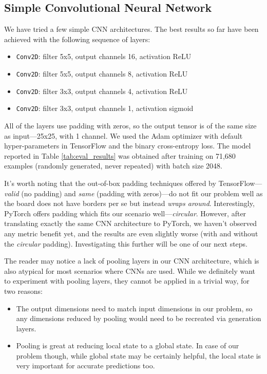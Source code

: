 \documentclass[conference]{IEEEtran}
\begin{document}
\subsection{Simple Convolutional Neural Network}

We have tried a few simple CNN architectures. The best results so far have been achieved with the following sequence of layers:

\begin{itemize}
    \item {\tt Conv2D}: filter 5x5, output channels 16, activation ReLU
    \item {\tt Conv2D}: filter 5x5, output channels 8, activation ReLU
    \item {\tt Conv2D}: filter 3x3, output channels 4, activation ReLU
    \item {\tt Conv2D}: filter 3x3, output channels 1, activation sigmoid
\end{itemize}

All of the layers use padding with zeros, so the output tensor is of the same size as input---25x25, with 1 channel. We used the Adam optimizer with default hyper-parameters in TensorFlow and the binary cross-entropy loss. The model reported in Table \ref{tab:eval_results} was obtained after training on 71,680 examples (randomly generated, never repeated) with batch size 2048.

It's worth noting that the out-of-box padding techniques offered by TensorFlow---{\it valid} (no padding) and {\it same} (padding with zeros)---do not fit our problem well as the board does not have borders per se but instead \emph{wraps around}. Interestingly, PyTorch offers padding which fits our scenario well---{\it circular}. However, after translating exactly the same CNN architecture to PyTorch, we haven't observed any metric benefit yet, and the results are even slightly worse (with and without the {\it circular} padding). Investigating this further will be one of our next steps.

The reader may notice a lack of pooling layers in our CNN architecture, which is also atypical for most scenarios where CNNs are used. While we definitely want to experiment with pooling layers, they cannot be applied in a trivial way, for two reasons:
\begin{itemize}
    \item The output dimensions need to match input dimensions in our problem, so any dimensions reduced by pooling would need to be recreated via generation layers.

    \item Pooling is great at reducing local state to a global state. In case of our problem though, while global state may be certainly helpful, the local state is very important for accurate predictions too.
\end{itemize}
\end{document}
